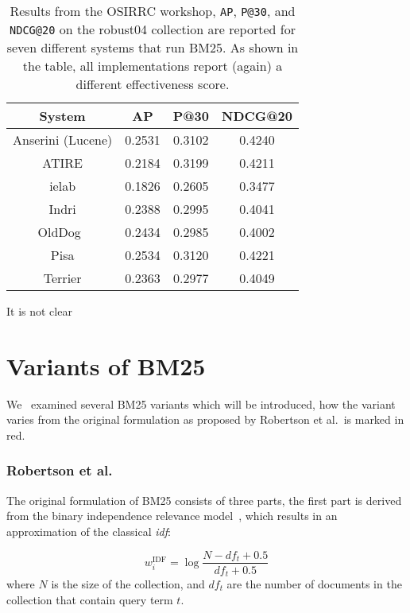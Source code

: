 \begin{table}
	\centering
	\caption{Results from the OSIRRC workshop\cite{OSIRRC}, \texttt{AP}, \texttt{P@30}, and \texttt{NDCG@20} on the robust04 collection are reported for seven different systems that run BM25. As shown in the table, all implementations report (again) a different effectiveness score.}
	\label{osirrc_results}
	\begin{tabular}{c c c c}
		\toprule
		System & AP & P@30 & NDCG@20 \\
		\midrule
		Anserini (Lucene) & 0.2531 & 0.3102 & 0.4240 \\
		ATIRE & 0.2184 & 0.3199 & 0.4211 \\
		ielab & 0.1826 & 0.2605 & 0.3477 \\
		Indri & 0.2388 & 0.2995 & 0.4041 \\
		OldDog~\cite{olddog-docker} & 0.2434 & 0.2985 & 0.4002 \\
		Pisa & 0.2534 & 0.3120 & 0.4221 \\
		Terrier & 0.2363 & 0.2977 & 0.4049 \\
		\bottomrule
	\end{tabular}
\end{table}

It is not clear 

\section{Variants of BM25}
We~\cite{Kamphuis2020BM25} examined several BM25 variants which will be introduced, how the variant varies from the original formulation as proposed by Robertson et al.~is marked in red. 

\subsubsection{Robertson et al.~\cite{bm25-robertson}} 
The original formulation of BM25 consists of three parts, the first part is derived from the binary independence relevance model~\cite{bm25-beyond}, which results in an approximation of the classical \textit{idf}:

\begin{equation} 
	w_i^{\text{IDF}} = \log\frac{N-df_t+0.5}{df_t+0.5}
\end{equation}
where $N$ is the size of the collection, and $df_t$ are the number of documents in the collection that contain query term $t$. 


